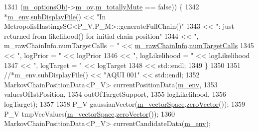 \begin{DoxyCode}
1341       (\hyperlink{class_q_u_e_s_o_1_1_metropolis_hastings_s_g_a5d0bc9f73d50d272aa6bfb5ef5939ef3}{m\_optionsObj}->\hyperlink{class_q_u_e_s_o_1_1_metropolis_hastings_s_g_options_a9d4792d9fc2dc5439b8ab489b0c236eb}{m\_ov}.\hyperlink{class_q_u_e_s_o_1_1_mh_options_values_af812309e81191e88dfdc87c5815141a3}{m\_totallyMute} == \textcolor{keyword}{false})) \{
1342     *\hyperlink{class_q_u_e_s_o_1_1_metropolis_hastings_s_g_ac8ea061e55b920e0c8f9bce5c3f20e52}{m\_env}.\hyperlink{class_q_u_e_s_o_1_1_base_environment_a8a0064746ae8dddfece4229b9ad374d6}{subDisplayFile}() << \textcolor{stringliteral}{"In MetropolisHastingsSG<P\_V,P\_M>::generateFullChain()"}
1343                             << \textcolor{stringliteral}{": just returned from likelihood() for initial chain position"}
1344                             << \textcolor{stringliteral}{", m\_rawChainInfo.numTargetCalls = "} << 
      \hyperlink{class_q_u_e_s_o_1_1_metropolis_hastings_s_g_ac531509489028853bb17c0353fc9eafd}{m\_rawChainInfo}.\hyperlink{struct_q_u_e_s_o_1_1_m_h_raw_chain_info_struct_a506e08bdffc1f777e33c7ec2d7862747}{numTargetCalls}
1345                             << \textcolor{stringliteral}{", logPrior = "}      << logPrior
1346                             << \textcolor{stringliteral}{", logLikelihood = "} << logLikelihood
1347                             << \textcolor{stringliteral}{", logTarget = "}     << logTarget
1348                             << std::endl;
1349   \}
1350 
1351   \textcolor{comment}{//*m\_env.subDisplayFile() << "AQUI 001" << std::endl;}
1352   MarkovChainPositionData<P\_V> currentPositionData(\hyperlink{class_q_u_e_s_o_1_1_metropolis_hastings_s_g_ac8ea061e55b920e0c8f9bce5c3f20e52}{m\_env},
1353                                                           valuesOf1stPosition,
1354                                                           outOfTargetSupport,
1355                                                           logLikelihood,
1356                                                           logTarget);
1357 
1358   P\_V gaussianVector(\hyperlink{class_q_u_e_s_o_1_1_metropolis_hastings_s_g_a2ef17fbfc6a156f03bbfad044b5a75f5}{m\_vectorSpace}.\hyperlink{class_q_u_e_s_o_1_1_vector_space_a92e963bb5cab3eecd290dfe4b8f03b04}{zeroVector}());
1359   P\_V tmpVecValues(\hyperlink{class_q_u_e_s_o_1_1_metropolis_hastings_s_g_a2ef17fbfc6a156f03bbfad044b5a75f5}{m\_vectorSpace}.\hyperlink{class_q_u_e_s_o_1_1_vector_space_a92e963bb5cab3eecd290dfe4b8f03b04}{zeroVector}());
1360   MarkovChainPositionData<P\_V> currentCandidateData(\hyperlink{class_q_u_e_s_o_1_1_metropolis_hastings_s_g_ac8ea061e55b920e0c8f9bce5c3f20e52}{m\_env});

\end{DoxyCode}
